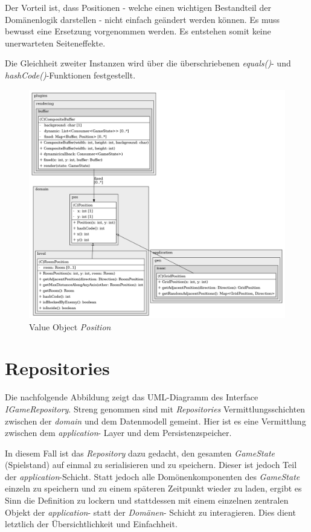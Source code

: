 Der Vorteil ist, dass Positionen - welche einen wichtigen Bestandteil
der Domänenlogik darstellen - nicht einfach geändert werden können.
Es muss bewusst eine Ersetzung vorgenommen werden. Es entstehen somit
keine unerwarteten Seiteneffekte.

Die Gleichheit zweiter Instanzen wird über die überschriebenen
\textit{equals()}- und \textit{hashCode()}-Funktionen festgestellt.

\vspace{0.5cm}
\begin{figure}[H]
    \centering
    \includegraphics[width=0.8\linewidth]{Bilder/Visualisierung/Position_structure.png}
    \caption{Value Object \textit{Position}}
\end{figure}

\section{Repositories}
Die nachfolgende Abbildung zeigt das UML-Diagramm des Interface
\textit{IGameRepository}. Streng genommen sind mit \textit{Repositories}
Vermittlungsschichten zwischen der \textit{domain} und dem Datenmodell
gemeint. Hier ist es eine Vermittlung zwischen dem \textit{application}-
Layer und dem Persistenzspeicher. 

In diesem Fall ist das \textit{Repository} dazu gedacht, den gesamten
\textit{GameState} (Spielstand) auf einmal zu serialisieren und zu
speichern. Dieser ist jedoch Teil der \textit{application}-Schicht.
Statt jedoch alle Domönenkomponenten des \textit{GameState} einzeln
zu speichern und zu einem späteren Zeitpunkt wieder zu laden, ergibt
es Sinn die Definition zu lockern und stattdessen mit einem einzelnen
zentralen Objekt der \textit{application}- statt der \textit{Domänen}-
Schicht zu interagieren. Dies dient letztlich der Übersichtlichkeit
und Einfachheit.

